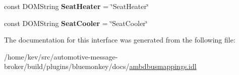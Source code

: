 \begin{DoxyCompactItemize}
\item 
\hypertarget{interfaceClimateControl_a1888bc9e70f14f17edcf846b97ddfc81}{const D\+O\+M\+String {\bfseries Seat\+Heater} = \char`\"{}Seat\+Heater\char`\"{}}\label{interfaceClimateControl_a1888bc9e70f14f17edcf846b97ddfc81}

\item 
\hypertarget{interfaceClimateControl_a116764f8cfe272dd5418fc418d07cb47}{const D\+O\+M\+String {\bfseries Seat\+Cooler} = \char`\"{}Seat\+Cooler\char`\"{}}\label{interfaceClimateControl_a116764f8cfe272dd5418fc418d07cb47}

\end{DoxyCompactItemize}


The documentation for this interface was generated from the following file\+:\begin{DoxyCompactItemize}
\item 
/home/kev/src/automotive-\/message-\/broker/build/plugins/bluemonkey/docs/\hyperlink{ambdbusmappings_8idl}{ambdbusmappings.\+idl}\end{DoxyCompactItemize}
